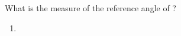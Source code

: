 What is the measure of the reference angle of ?
\newline
\begin{enumerate}
    \item
\end{enumerate}

